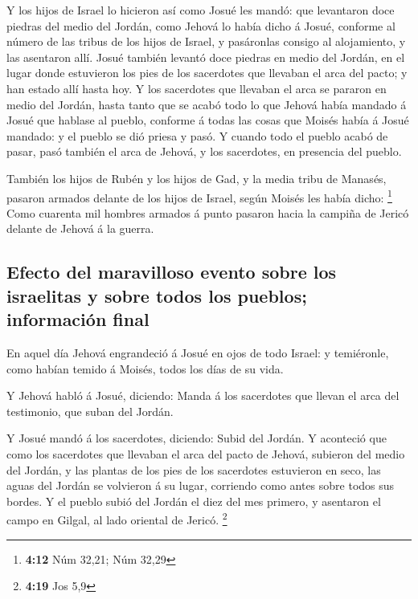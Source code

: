  Y los hijos de Israel lo hicieron así como Josué les mandó:
que levantaron doce piedras del medio del Jordán, como Jehová lo había
dicho á Josué, conforme al número de las tribus de los hijos de Israel,
y pasáronlas consigo al alojamiento, y las asentaron allí. 
Josué también levantó doce piedras en medio del Jordán, en el lugar
donde estuvieron los pies de los sacerdotes que llevaban el arca del
pacto; y han estado allí hasta hoy.  Y los sacerdotes que
llevaban el arca se pararon en medio del Jordán, hasta tanto que se
acabó todo lo que Jehová había mandado á Josué que hablase al pueblo,
conforme á todas las cosas que Moisés había á Josué mandado: y el pueblo
se dió priesa y pasó.  Y cuando todo el pueblo acabó de
pasar, pasó también el arca de Jehová, y los sacerdotes, en presencia
del pueblo.

 También los hijos de Rubén y los hijos de Gad, y la media
tribu de Manasés, pasaron armados delante de los hijos de Israel, según
Moisés les había dicho: \footnote{\textbf{4:12} Núm 32,21; Núm 32,29}
 Como cuarenta mil hombres armados á punto pasaron hacia la
campiña de Jericó delante de Jehová á la guerra.

\hypertarget{efecto-del-maravilloso-evento-sobre-los-israelitas-y-sobre-todos-los-pueblos-informaciuxf3n-final}{%
\subsection{Efecto del maravilloso evento sobre los israelitas y sobre
todos los pueblos; información
final}\label{efecto-del-maravilloso-evento-sobre-los-israelitas-y-sobre-todos-los-pueblos-informaciuxf3n-final}}

 En aquel día Jehová engrandeció á Josué en ojos de todo
Israel: y temiéronle, como habían temido á Moisés, todos los días de su
vida.

 Y Jehová habló á Josué, diciendo:  Manda á
los sacerdotes que llevan el arca del testimonio, que suban del Jordán.

 Y Josué mandó á los sacerdotes, diciendo: Subid del
Jordán.  Y aconteció que como los sacerdotes que llevaban
el arca del pacto de Jehová, subieron del medio del Jordán, y las
plantas de los pies de los sacerdotes estuvieron en seco, las aguas del
Jordán se volvieron á su lugar, corriendo como antes sobre todos sus
bordes.  Y el pueblo subió del Jordán el diez del mes
primero, y asentaron el campo en Gilgal, al lado oriental de Jericó.
\footnote{\textbf{4:19} Jos 5,9}

